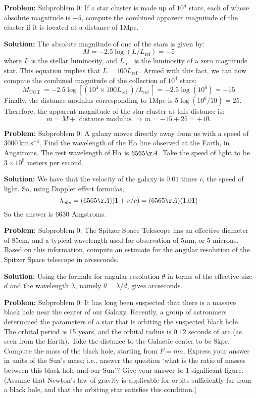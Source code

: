 \documentclass[10pt]{article}
\begin{document}
\textbf{Problem:}
Subproblem 0: If a star cluster is made up of $10^{4}$ stars, each of whose absolute magnitude is $-5$, compute the combined apparent magnitude of the cluster if it is located at a distance of $1 \mathrm{Mpc}$.


\textbf{Solution:}
The absolute magnitude of one of the stars is given by:
\[
M=-2.5 \log \left(L / L_{\mathrm{ref}}\right)=-5
\]
where $L$ is the stellar luminosity, and $L_{\text {ref }}$ is the luminosity of a zero magnitude star. This equation implies that $L=100 L_{\text {ref }}$. Armed with this fact, we can now compute the combined magnitude of the collection of $10^{4}$ stars:
\[
M_{\text {TOT }}=-2.5 \log \left[\left(10^{4} \times 100 L_{\text {ref }}\right) / L_{\text {ref }}\right]=-2.5 \log \left(10^{6}\right)=-15
\]
Finally, the distance modulus corresponding to $1 \mathrm{Mpc}$ is $5 \log \left(10^{6} / 10\right)=25$. Therefore, the apparent magnitude of the star cluster at this distance is:
\[
m=M+\text { distance modulus } \Rightarrow m=-15+25=+\boxed{10} .
\]


\textbf{Problem:}
Subproblem 0: A galaxy moves directly away from us with a speed of $3000 \mathrm{~km} \mathrm{~s}^{-1}$. Find the wavelength of the $\mathrm{H} \alpha$ line observed at the Earth, in Angstroms. The rest wavelength of $\mathrm{H} \alpha$ is $6565 \AA$.  Take the speed of light to be $3\times 10^8$ meters per second.


\textbf{Solution:}
We have that the velocity of the galaxy is $0.01$ times $c$, the speed of light.  So, using Doppler effect formulas,
\begin{equation}
\lambda_{obs} = (6565 \AA)(1 + v/c) = (6565 \AA)(1.01)
\end{equation}
So the answer is $\boxed{6630}$ Angstroms.


\textbf{Problem:}
Subproblem 0: The Spitzer Space Telescope has an effective diameter of $85 \mathrm{cm}$, and a typical wavelength used for observation of $5 \mu \mathrm{m}$, or 5 microns. Based on this information, compute an estimate for the angular resolution of the Spitzer Space telescope in arcseconds.


\textbf{Solution:}
Using the formula for angular resolution $\theta$ in terms of the effective size $d$ and the wavelength $\lambda$, namely $\theta = \lambda/d$, gives  arcseconds.


\textbf{Problem:}
Subproblem 0: It has long been suspected that there is a massive black hole near the center of our Galaxy. Recently, a group of astronmers determined the parameters of a star that is orbiting the suspected black hole. The orbital period is 15 years, and the orbital radius is $0.12$ seconds of arc (as seen from the Earth). Take the distance to the Galactic center to be $8 \mathrm{kpc}$. Compute the mass of the black hole, starting from $F=m a$. Express your answer in units of the Sun's mass; i.e., answer the question `what is the ratio of masses between this black hole and our Sun'? Give your answer to 1 significant figure. (Assume that Newton's law of gravity is applicable for orbits sufficiently far from a black hole, and that the orbiting star satisfies this condition.)
\end{document}
